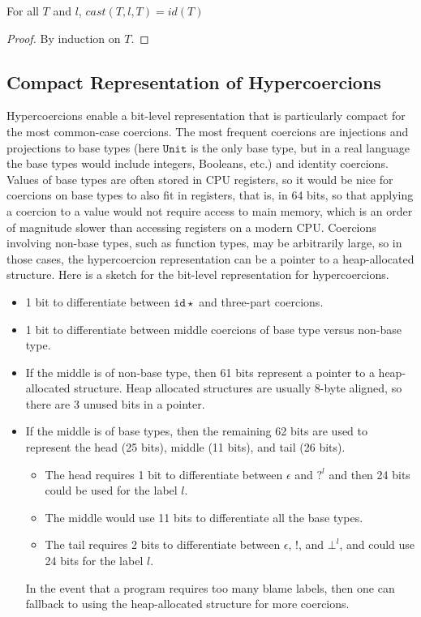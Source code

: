 \documentclass[acmsmall,review,anonymous]{acmart}\settopmatter{printfolios=true,printccs=false,printacmref=false}
\newcommand{\lazyUD}{Lazy\;UD}
\newcommand{\POOunit}[0]{\mathtt{Unit}}
\newcommand{\hyperCoercionI}[0]{\mathtt{id\star}}
\begin{document}
\begin{proposition}[\lazyUD{} Identity Casts]
  For all $T$ and $l$, $cast(T,l,T) = id(T) $
\end{proposition}
\begin{proof}
  By induction on $T$.
\end{proof}


\subsection{Compact Representation of Hypercoercions}

Hypercoercions enable a bit-level representation that is particularly
compact for the most common-case coercions. The most frequent
coercions are injections and projections to base types (here
$\POOunit$ is the only base type, but in a real language the base
types would include integers, Booleans, etc.) and identity coercions.
Values of base types are often stored in CPU registers, so it would be
nice for coercions on base types to also fit in registers, that is, in
64 bits, so that applying a coercion to a value would not require
access to main memory, which is an order of magnitude slower than
accessing registers on a modern CPU.
%
Coercions involving non-base types, such as function types,
may be arbitrarily large, so in those cases, the hypercoercion
representation can be a pointer to a heap-allocated structure.  Here
is a sketch for the bit-level representation for hypercoercions.

\begin{itemize}
\item 1 bit to differentiate between $\hyperCoercionI$
  and three-part coercions.

\item 1 bit to differentiate between middle coercions of base type
  versus non-base type.

\item If the middle is of non-base type, then 61 bits represent a
  pointer to a heap-allocated structure. Heap allocated structures are
  usually 8-byte aligned, so there are 3 unused bits in a pointer.

\item If the middle is of base types, then the remaining 62 bits are
  used to represent the head (25 bits), middle (11 bits), and tail (26
  bits).
  \begin{itemize}
  \item The head requires 1 bit to differentiate between $\epsilon$
    and $?^l$ and then 24 bits could be used for the label $l$.
  \item The middle would use 11 bits to differentiate all the base types.
  \item The tail requires 2 bits to differentiate between $\epsilon$,
    $!$, and $\bot^l$, and could use 24 bits for the label $l$.
  \end{itemize}
  In the event that a program requires too many blame labels, then one
  can fallback to using the heap-allocated structure for more
  coercions.
\end{itemize}
  
\end{document}
